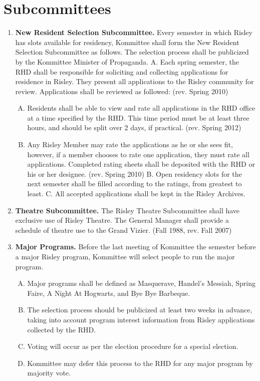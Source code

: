 \documentclass[12pt]{article}
\begin{document}
\section*{Subcommittees}
\begin{enumerate}[1.]
\item \textbf{New Resident Selection Subcommittee.} Every semester in which Risley has slots available for residency, Kommittee shall form the New Resident Selection Subcommittee as follows. The selection process shall be publicized by the Kommittee Minister of Propaganda. A. Each spring semester, the RHD shall be responsible for soliciting and collecting applications for residence in Risley. They present all applications to the Risley community for review. Applications shall be reviewed as followed: (rev. Spring 2010)
\begin{enumerate}[A.]
\item Residents shall be able to view and rate all applications in the RHD office at a time specified by the RHD. This time period must be at least three hours, and should be split over 2 days, if practical. (rev. Spring 2012)
\item Any Risley Member may rate the applications as he or she sees fit, however, if a member chooses to rate one application, they must rate all applications. Completed rating sheets shall be deposited with the RHD or his or her designee. (rev. Spring 2010) B. Open residency slots for the next semester shall be filled according to the ratings, from greatest to least. C. All accepted applications shall be kept in the Risley Archives.
\end{enumerate}
\item \textbf{Theatre Subcommittee.} The Risley Theatre Subcommittee shall have exclusive use of Risley Theatre. The General Manager shall provide a schedule of theatre use to the Grand Vizier. (Fall 1988, rev. Fall 2007)
\item \textbf{Major Programs.} Before the last meeting of Kommittee the semester before a major Risley program, Kommittee will select people to run the major program. 
\begin{enumerate}[A.]
\item Major programs shall be defined as Masquerave, Handel's Messiah, Spring Faire, A Night At Hogwarts, and Bye Bye Barbeque.
\item The selection process should be publicized at least two weeks in advance, taking into account program interest information from Risley applications collected by the RHD. 
\item Voting will occur as per the election procedure for a special election. 
\item Kommittee may defer this process to the RHD for any major program by majority vote.
\end{enumerate}
\end{enumerate}
\end{document}
